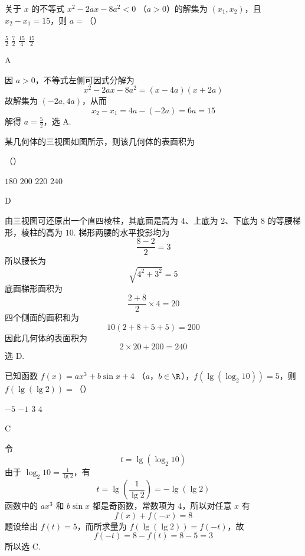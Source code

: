 \begin{problem}
关于 \(x\) 的不等式 \(x^{2} - 2ax - 8a^{2} < 0 \) （\(a > 0\)）的解集为 \((x_{1}, x_{2})\)，且 \(x_{2} - x_{1} = 15\)，则 \(a =\)（\quad）

\choices
    {\( \frac{5}{2} \)}
    {\( \frac{7}{2} \)}
    {\( \frac{15}{4} \)}
    {\( \frac{15}{2} \)}
\begin{answer}
A
\end{answer}
\begin{solution}
因 \(a>0\)，不等式左侧可因式分解为
\[
x^2-2ax-8a^2=(x-4a)(x+2a)
\]
故解集为 \((-2a,4a)\)，从而
\[
x_2-x_1=4a-(-2a)=6a=15
\]
解得 \(a=\frac52\)，选 A.
\end{solution}
\end{problem}

\begin{problem}
某几何体的三视图如图所示，则该几何体的表面积为


（\quad）

\choices
    {\(180\)}
    {\(200\)}
    {\(220\)}
    {\(240\)}
\begin{answer}
D
\end{answer}
\begin{solution}
由三视图可还原出一个直四棱柱，其底面是高为 \(4\)、上底为 \(2\)、下底为 \(8\) 的等腰梯形，棱柱的高为 \(10\). 梯形两腰的水平投影均为
\[
\frac{8-2}{2}=3
\]
所以腰长为
\[
\sqrt{4^2+3^2}=5
\]
底面梯形面积为
\[
\frac{2+8}{2}\times4=20
\]
四个侧面的面积和为
\[
10(2+8+5+5)=200
\]
因此几何体的表面积为
\[
2\times20+200=240
\]
选 D.
\end{solution}
\end{problem}

\begin{problem}
已知函数 \( f(x) = ax^3 + b\sin x + 4 \) （\(a\)，\(b \in \R\)），\( f(\lg (\log_2 10)) = 5 \)，则 \( f(\lg (\lg 2)) = \)（\quad）

\choices
    {\(-5\)}
    {\(-1\)}
    {\(3\)}
    {\(4\)}
\begin{answer}
C
\end{answer}
\begin{solution}
令
\[
t=\lg(\log_2 10)
\]
由于 \(\log_2 10=\frac{1}{\lg2}\)，有
\[
t=\lg\left(\frac1{\lg2}\right)=-\lg(\lg2)
\]
函数中的 \(ax^3\) 和 \(b\sin x\) 都是奇函数，常数项为 \(4\)，所以对任意 \(x\) 有
\[
f(x)+f(-x)=8
\]
题设给出 \(f(t)=5\)，而所求量为 \(f(\lg(\lg2))=f(-t)\)，故
\[
f(-t)=8-f(t)=8-5=3
\]
所以选 C.
\end{solution}
\end{problem}

